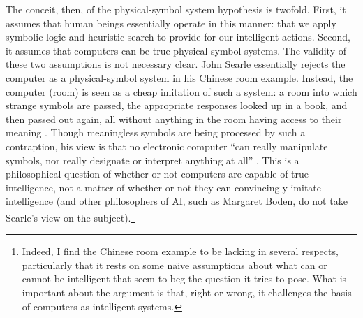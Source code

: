The conceit, then, of the physical-symbol system hypothesis is twofold.
First, it assumes that
human beings essentially operate in this manner: that we apply
symbolic logic and heuristic search to provide for our intelligent
actions. Second, it assumes that computers can be true physical-symbol
systems. The validity of these two assumptions is not necessary clear. John Searle
essentially rejects the computer as a physical-symbol system in his
Chinese room example. Instead, the computer (room) is seen as a cheap
imitation of such a system: a room into which strange symbols are
passed, the appropriate responses looked up in a book,
and then passed out again, all without anything in the room having
access to their meaning \cite{chineseSearle}. Though meaningless
symbols are being processed by such a contraption, his view is that no
electronic computer ``can really manipulate symbols, nor really
designate or interpret anything at all'' \cite{escapingBoden}. This is
a philosophical question of whether or not computers are capable of
true intelligence, not a matter of whether or not they can
convincingly imitate intelligence (and other philosophers of AI, such
as Margaret Boden, do not take Searle's view on the
subject).\footnote{Indeed, I find the Chinese room example to be
  lacking in several respects, particularly that it rests on some
  na\"{\i}ve assumptions about what can or cannot be intelligent that seem to beg
  the question it tries to pose. What is important about the
  argument is that, right or wrong, it challenges the basis of
  computers as intelligent systems.}

